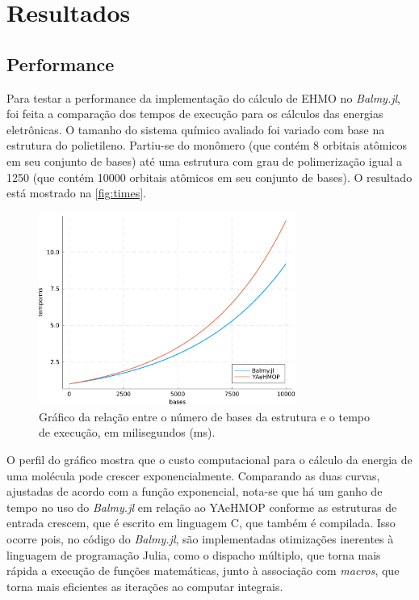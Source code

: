 \chapter{Resultados}

\section{Performance}

Para testar a performance da implementação do cálculo de \gls{EHMO} no \textit{Balmy.jl}, foi feita a comparação dos tempos de execução para os cálculos das energias eletrônicas. O tamanho do sistema químico avaliado foi variado com base na estrutura do polietileno. Partiu-se do monômero (que contém 8 orbitais atômicos em seu conjunto de bases) até uma estrutura com grau de polimerização igual a 1250 (que contém 10000 orbitais atômicos em seu conjunto de bases). O resultado está mostrado na \autoref{fig:times}.

\begin{figure}[htb]
\caption{\label{fig:times} Gráfico da relação entre o número de bases da estrutura e o tempo de execução, em milisegundos (ms).}
	\begin{center}
		\includegraphics[width=0.75\textwidth]{images/tttt.png}
	\end{center}
\end{figure}

O perfil do gráfico mostra que o custo computacional para o cálculo da energia de uma molécula pode crescer exponencialmente. Comparando as duas curvas, ajustadas de acordo com a função exponencial, nota-se que há um ganho de tempo no uso do \textit{Balmy.jl} em relação ao \gls{YAeHMOP} conforme as estruturas de entrada crescem, que é escrito em linguagem C, que também é compilada. Isso ocorre pois, no código do \textit{Balmy.jl}, são implementadas otimizações inerentes à linguagem de programação Julia, como o dispacho múltiplo, que torna mais rápida a execução de funções matemáticas, junto à associação com \textit{macros}, que torna mais eficientes as iterações ao computar integrais.

